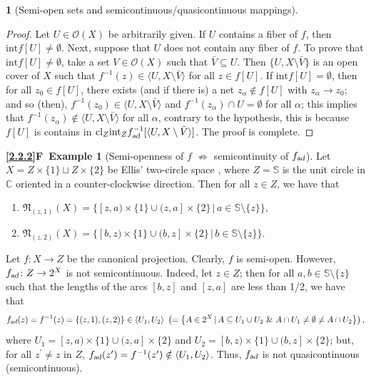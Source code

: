 \documentclass[12pt,final,3p,times]{elsarticle}
\theoremstyle{definition}
\newtheorem{sse}[sthm]{}
\newtheorem*{2.2.2F}{\ref{2.2.2}F~Example}
\numberwithin{equation}{section}
\begin{document}
\begin{sse}[Semi-open sets and semicontinuous/quasicontinuous mappings]
\begin{proof}
Let $U\in\mathscr{O}(X)$ be arbitrarily given. If $U$ contains a fiber of $f$, then $\textrm{int}f[U]\not=\emptyset$. Next, suppose that $U$ does not contain any fiber of $f$. To prove that $\textrm{int}f[U]\not=\emptyset$, take a set $V\in\mathscr{O}(X)$ such that $\bar{V}\subseteq U$. Then $\{U,X\setminus\bar{V}\}$ is an open cover of $X$ such that $f^{-1}(z)\in\langle U,X\setminus\bar{V}\rangle$ for all $z\in f[U]$. If $\textrm{int}f[U]=\emptyset$, then for all $z_0\in f[U]$, there exists (and if there is) a net $z_\alpha\notin f[U]$ with $z_\alpha\to z_0$; and so (then), $f^{-1}(z_0)\in\langle U,X\setminus\bar{V}\rangle$ and $f^{-1}(z_\alpha)\cap U=\emptyset$ for all $\alpha$; this implies that $f^{-1}(z_\alpha)\notin\langle U,X\setminus\bar{V}\rangle$ for all $\alpha$, contrary to the hypothesis, this is because $f[U]$ is contains in $\textrm{cl}_Z\textrm{int}_Zf_\textsl{ad}^{-1}[\langle U,X\setminus\bar{V}\rangle]$. The proof is complete.
\end{proof}

\begin{2.2.2F}[Semi-openness of $f$ $\not\Rightarrow$ semicontinuity of $f_\textsl{ad}$]
Let $X=Z\times\{1\}\sqcup Z\times\{2\}$ be Ellis' two-circle space \cite[Ex.~5.29]{E69}, where $Z=\mathbb{S}$ is the unit circle in $\mathbb{C}$ oriented in a counter-clockwise direction. Then for all $z\in Z$, we have that 
\begin{enumerate}
    \item[] $\mathfrak{N}_{(z,1)}(X)=\{[z,a)\times\{1\}\cup(z,a]\times\{2\}\,|\,a\in\mathbb{S}\setminus\{z\}\}$,
    \item[] $\mathfrak{N}_{(z,2)}(X)=\{[b,z)\times\{1\}\cup(b,z]\times\{2\}\,|\,b\in\mathbb{S}\setminus\{z\}\}$.
\end{enumerate}
Let $f\colon X\rightarrow Z$ be the canonical projection. Clearly, $f$ is semi-open. However, $f_\textsl{ad}\colon Z\rightarrow 2^X$ is not semicontinuous. Indeed, let $z\in Z$; then for all $a,b\in\mathbb{S}\setminus\{z\}$ such that the lengths of the arcs $[b,z]$ and $[z,a]$ are less than 1/2, we have that 
$$
f_\textsl{ad}(z)=f^{-1}(z)=\{(z,1), (z,2)\}\in\langle U_1,U_2\rangle\ \left(=\left\{A\in2^X\,|\,A\subseteq U_1\cup U_2\ \&\ A\cap U_1\not=\emptyset\not=A\cap U_2\right\}\right),
$$
where $U_1=[z,a)\times\{1\}\cup(z,a]\times\{2\}$ and $U_2=[b,z)\times\{1\}\cup(b,z]\times\{2\}$; but, for all $z^\prime\not=z$ in $Z$, $f_\textsl{ad}(z^\prime)=f^{-1}(z^\prime)\notin\langle U_1,U_2\rangle$. Thus, $f_\textsl{ad}$ is not quasicontinuous (semicontinuous).
\end{2.2.2F}


\end{sse}
\end{document}
